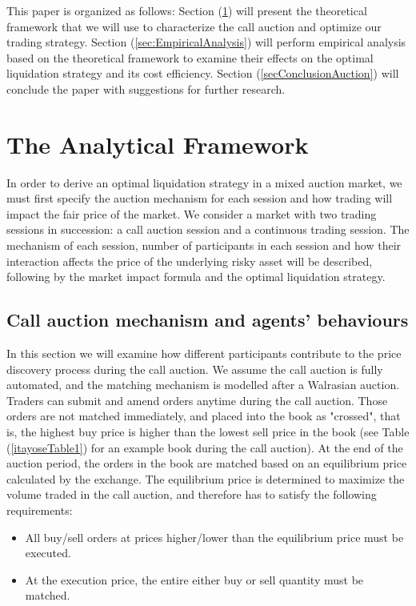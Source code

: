 This paper is organized as follows: Section (\ref{sec:AnalyticalFramework}) will present the theoretical framework that we will use to characterize the call auction and optimize our trading strategy. Section (\ref{sec:EmpiricalAnalysis}) will perform empirical analysis based on the theoretical framework to examine their effects on the optimal liquidation strategy and its cost efficiency. Section (\ref{secConclusionAuction}) will conclude the paper with suggestions for further research.

\section{The Analytical Framework}\label{sec:AnalyticalFramework}

In order to derive an optimal liquidation strategy in a mixed auction market, we must first specify the auction mechanism for each session and how trading will impact the fair price of the market. We consider a market with two trading sessions in succession: a call auction session and a continuous trading session. The mechanism of each session, number of participants in each session and how their interaction affects the price of the underlying risky asset will be described, following by the market impact formula and the optimal liquidation strategy.

\subsection{Call auction mechanism and agents' behaviours}\label{subsec:AnalyticalFrameworkCallAuction}

In this section we will examine how different participants contribute to the price discovery process during the call auction. We assume the call auction is fully automated, and the matching mechanism is modelled after a Walrasian auction. Traders can submit and amend orders anytime during the call auction. Those orders are not matched immediately, and placed into the book as "crossed", that is, the highest buy price is higher than the lowest sell price in the book (see Table (\ref{itayoseTable1}) for an example book during the call auction). At the end of the auction period, the orders in the book are matched based on an equilibrium price calculated by the exchange. The equilibrium price is determined to maximize the volume traded in the call auction, and therefore has to satisfy the following requirements:

\begin{itemize}
  \item All buy/sell orders at prices higher/lower than the equilibrium price must be executed.
  \item At the execution price, the entire either buy or sell quantity must be matched.
\end{itemize}

